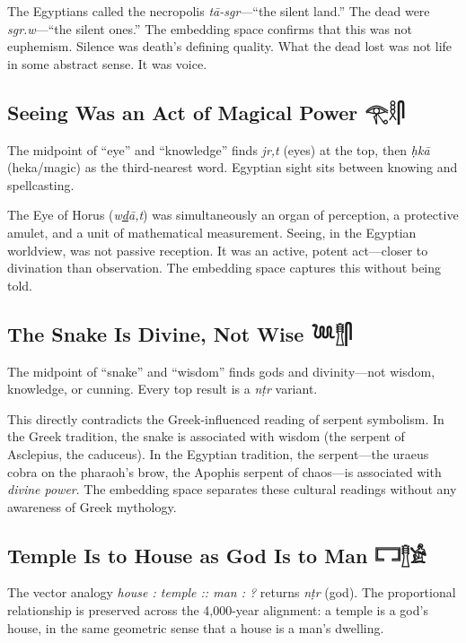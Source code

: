\documentclass[11pt, a4paper]{article}
\newcommand{\hiero}[1]{{\normalfont\hierofont #1}}
\begin{document}
The Egyptians called the necropolis \textit{t\=a-sgr}---``the silent land.'' The dead were \textit{sgr.w}---``the silent ones.'' The embedding space confirms that this was not euphemism. Silence was death's defining quality. What the dead lost was not life in some abstract sense. It was voice.

\subsection{Seeing Was an Act of Magical Power \hfill \hiero{𓂀𓎛𓋴}}

The midpoint of ``eye'' and ``knowledge'' finds \textit{jr,t} (eyes) at the top, then \textit{\d{h}k\=a} (heka/magic) as the third-nearest word. Egyptian sight sits between knowing and spellcasting.

The Eye of Horus (\textit{w\underline{d}\=a,t}) was simultaneously an organ of perception, a protective amulet, and a unit of mathematical measurement. Seeing, in the Egyptian worldview, was not passive reception. It was an active, potent act---closer to divination than observation. The embedding space captures this without being told.

\subsection{The Snake Is Divine, Not Wise \hfill \hiero{𓆙𓊽𓋴}}

The midpoint of ``snake'' and ``wisdom'' finds gods and divinity---not wisdom, knowledge, or cunning. Every top result is a \textit{n\d{t}r} variant.

This directly contradicts the Greek-influenced reading of serpent symbolism. In the Greek tradition, the snake is associated with wisdom (the serpent of Asclepius, the caduceus). In the Egyptian tradition, the serpent---the uraeus cobra on the pharaoh's brow, the Apophis serpent of chaos---is associated with \textit{divine power}. The embedding space separates these cultural readings without any awareness of Greek mythology.

\subsection{Temple Is to House as God Is to Man \hfill \hiero{𓉐𓊽𓀀}}

The vector analogy \textit{house : temple :: man : ?} returns \textit{n\d{t}r} (god). The proportional relationship is preserved across the 4,000-year alignment: a temple is a god's house, in the same geometric sense that a house is a man's dwelling.
\end{document}
